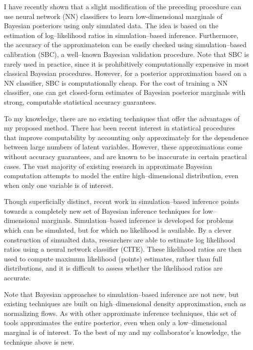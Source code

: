 I have recently shown that a slight modification of the preceding procedure can
use neural network (NN) classifiers to learn low-dimensional marginals of
Bayesian posteriors using only simulated data.  The idea is based on the
estimation of log--likelihood ratios in simulation--based inference.
Furthermore, the accuracy of the approximateion can be easily checked using
simulation--based calibration (SBC), a well--known Bayesian validation
procedure.  Note that SBC is rarely used in practice, since it is prohibitively
computationally expensive in most   classical Bayesian procedures.  However, for
a posterior approximation based on a NN classifier, SBC is computationally
cheap.  For the cost of training a NN classifier, one can get closed-form
estimates of Bayesian posterior marginals with strong, computable statistical
accuracy guarantees.

To my knowledge, there are no existing techniques that offer the advantages of
my proposed method. There has been recent interest in statistical procedures
that improve computability by accounting only approximately for the dependence
between large numbers of latent variables.  However, these approximations come
without accuracy guarantees, and are known to be inaccurate in certain practical
cases. The vast majority of existing research in approximate Bayesian
computation attempts to model the entire high--dimensional distribution, even
when only one variable is of interest.

Though superficially distinct, recent work in simulation--based inference points
towards a completely new set of Bayesian inference techniques for
low--dimensional marginals.  Simulation--based inference is developed for
problems which can be simulated, but for which no likelihood is available.  By a
clever construction of simualted data, researchers are able to estimate log
likelihood ratios using a neural network classifier (CITE).  These likelihood
ratios are then used to compute maximum likelihood (points) estimates, rather
than full distributions, and it is difficult to assess whether the likelihood
ratios are accurate.


Note that Bayesian approaches to simulation--based inference are not new, but
existing techniques are built on high--dimensional density approximation, such
as normalizing flows.  As with other approximate inference techniques, this set
of tools approximates the entire posterior, even when only a low--dimensional
marginal is of interest.  To the best of my and my collaborator's knowledge, the
technique above is new.  

